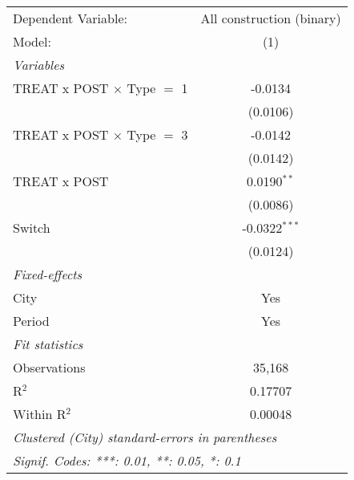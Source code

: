 \begingroup
\centering
\begin{tabular}{lc}
   \tabularnewline \midrule \midrule
   Dependent Variable:               & All construction (binary)\\  
   Model:                            & (1)\\  
   \midrule
   \emph{Variables}\\
   TREAT x POST $\times$ Type $=$ 1  & -0.0134\\   
                                     & (0.0106)\\   
   TREAT x POST $\times$ Type $=$ 3  & -0.0142\\   
                                     & (0.0142)\\   
   TREAT x POST                      & 0.0190$^{**}$\\   
                                     & (0.0086)\\   
   Switch                            & -0.0322$^{***}$\\   
                                     & (0.0124)\\   
   \midrule
   \emph{Fixed-effects}\\
   City                              & Yes\\  
   Period                            & Yes\\  
   \midrule
   \emph{Fit statistics}\\
   Observations                      & 35,168\\  
   R$^2$                             & 0.17707\\  
   Within R$^2$                      & 0.00048\\  
   \midrule \midrule
   \multicolumn{2}{l}{\emph{Clustered (City) standard-errors in parentheses}}\\
   \multicolumn{2}{l}{\emph{Signif. Codes: ***: 0.01, **: 0.05, *: 0.1}}\\
\end{tabular}
\par\endgroup
